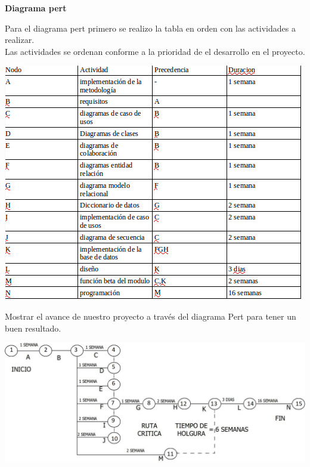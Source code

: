 \documentclass[10pt,a4paper]{report}
\begin{document}

\begin{titlepage}
{\Large\bfseries \center   Diagrama pert  \par}
 \vspace{.5cm}
 \justify
Para el diagrama pert primero se realizo la tabla en orden con las actividades a realizar.\\
 Las actividades se ordenan conforme a la prioridad de el desarrollo en el proyecto.
\begin{center}
\includegraphics[scale=.6]{2.jpg} 
\end{center}
Mostrar el avance de nuestro proyecto a través del diagrama Pert para tener un buen resultado.
\begin{center}
\includegraphics[scale=.3]{3.jpg} 
\end{center}
\end{titlepage}
\end{document}
